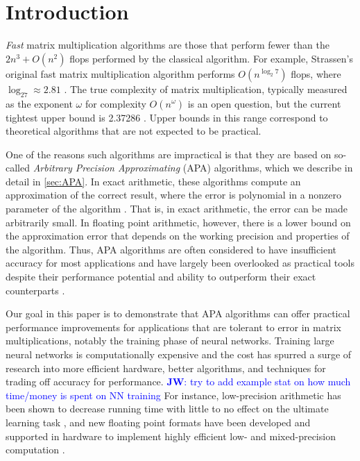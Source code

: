 \documentclass[conference]{IEEEtran}
\newcommand{\JW}[1]{\textcolor{blue}{\textbf{JW}: #1}}
\begin{document}
\section{Introduction}

\emph{Fast} matrix multiplication algorithms are those that perform fewer than the $2n^3+O(n^2)$ flops performed by the classical algorithm.
For example, Strassen's original fast matrix multiplication algorithm performs $O(n^{\log_2 7})$ flops, where $\log_27 \approx 2.81$ \cite{Strassen69}.
The true complexity of matrix multiplication, typically measured as the exponent $\omega$ for complexity $O(n^\omega)$ is an open question, but the current tightest upper bound is 2.37286 \cite{AW21}.
Upper bounds in this range correspond to theoretical algorithms that are not expected to be practical.

One of the reasons such algorithms are impractical is that they are based on so-called \emph{Arbitrary Precision Approximating} (APA) algorithms, which we describe in detail in \cref{sec:APA}.
In exact arithmetic, these algorithms compute an approximation of the correct result, where the error is polynomial in a nonzero parameter of the algorithm \cite{BLR80}.
That is, in exact arithmetic, the error can be made arbitrarily small.
In floating point arithmetic, however, there is a lower bound on the approximation error that depends on the working precision and properties of the algorithm.
Thus, APA algorithms are often considered to have insufficient accuracy for most applications and have largely been overlooked as practical tools despite their performance potential and ability to outperform their exact counterparts \cite{BB15}.

Our goal in this paper is to demonstrate that APA algorithms can offer practical performance improvements for applications that are tolerant to error in matrix multiplications, notably the training phase of neural networks.
Training large neural networks is computationally expensive and the cost has spurred a surge of research into more efficient hardware, better algorithms, and techniques for trading off accuracy for performance.
\JW{try to add example stat on how much time/money is spent on NN training}
For instance, low-precision arithmetic has been shown to decrease running time with little to no effect on the ultimate learning task \cite{GAGN15,HCSEB17}, and new floating point formats have been developed and supported in hardware to implement highly efficient low- and mixed-precision computation \cite{KM+19,YWC20}.
\end{document}
